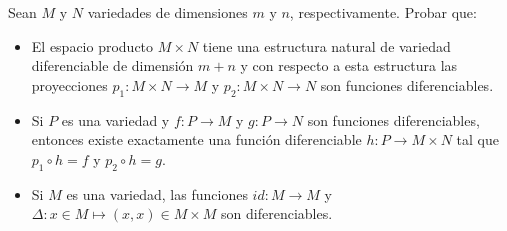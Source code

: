 \documentclass[11pt]{article}
\newcommand{\paint}[2]{\color{#1}{#2}}
\newenvironment{exercise}[2][Ejercicio]{\begin{trivlist}
\item[\hskip \labelsep \paint{purple}{{\bfseries #1}}\hskip \labelsep {\bfseries #2.}]}{\end{trivlist}}
\begin{document}
\begin{exercise}{7} Sean $M$ y $N$ variedades de dimensiones $m$ y $n$, respectivamente. Probar que:
\begin{itemize}
\item[(a)] El espacio producto $M \times N$ tiene una estructura natural de
variedad diferenciable de dimensi\'on $m+n$ y con respecto a esta estructura
las proyecciones $p_1:M\times N\to M$ y $p_2:M\times N\to N$ son funciones diferenciables.
\item[(b)] Si $P$ es una variedad y $f:P\to M$ y $g:P\to N$ son funciones
diferenciables, entonces existe exactamente una funci\'on diferenciable $h:P\to M\times N$ tal que $p_1\circ h=f$ y $p_2\circ h=g$.
\item[(c)] Si $M$ es una variedad, las funciones $id : M \to M$ y $\Delta : x \in M \mapsto (x, x) \in M \times M$ son diferenciables.
\end{itemize}
\end{exercise}
\end{document}
